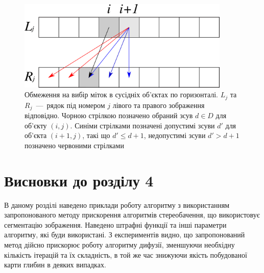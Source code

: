 \begin{figure}[h]
  \centering
  \includegraphics[width=0.9\textwidth]{images/disparity_restriction_edges}
  \caption{Обмеження на вибір міток в сусідніх об'єктах по горизонталі.
           $L_j$ та $R_j$~---~рядок під номером $j$
           лівого та правого зображення відповідно.
           Чорною стрілкою позначено обраний зсув $d \in D$ для об'єкту
           $\left(i, j \right)$.
           Синіми стрілками позначені допустимі зсуви $d'$
           для об'єкта $\left(i + 1, j \right)$, такі що $d' \le d + 1$,
           недопустимі зсуви $d' > d + 1$ позначено червоними стрілками}
  \label{fig:disparity:restriction:edge}
\end{figure}

\section*{Висновки до розділу 4}

В даному розділі наведено приклади роботу алгоритму
з використанням запропонованого методу прискорення алгоритмів стереобачення,
що використовує сегментацію зображення.
Наведено штрафні функції та інші параметри алгоритму, які буди використані.
З експериментів видно, що запропонований метод дійсно прискорює роботу алгоритму дифузії,
зменшуючи необхідну кількість ітерацій та їх складність,
в той же час знижуючи якість побудованої карти глибин в деяких випадках.
